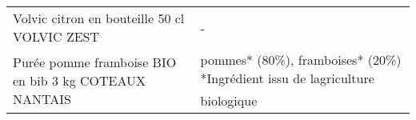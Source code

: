\begin{longtable}{p{5cm}p{10cm}}
                                                             Volvic citron en bouteille 50 cl VOLVIC ZEST &                                                                                                                                                                                                                                                                                                                                                                                                                                                                                                                                                                                                                                                                                                                                                                                                                                                                                                                                                                                                                                        - \\
                                                    Purée pomme framboise BIO en bib 3 kg COTEAUX NANTAIS &                                                                                                                                                                                                                                                                                                                                                                                                                                                                                                                                                                                                                                                                                                                                                                                                                                                                                                                                                           pommes* (80\%), framboises* (20\%)  *Ingrédient issu de lagriculture biologique \\

\end{longtable}
